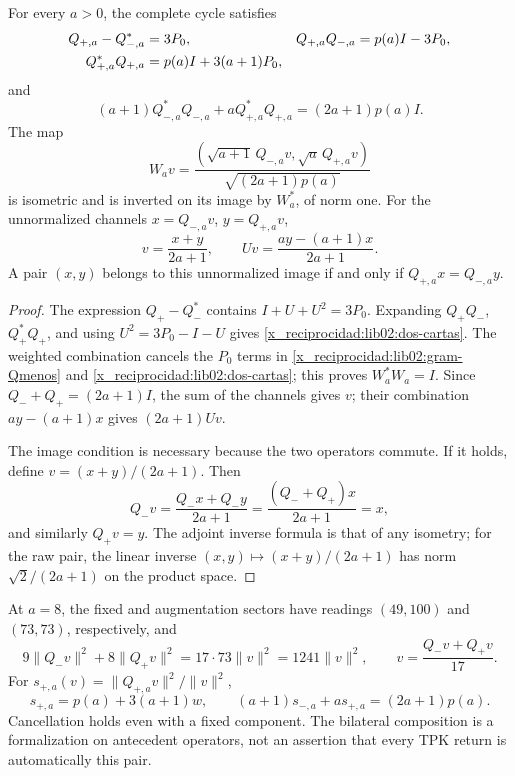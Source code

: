 \begin{theorem}
\label{x_reciprocidad:lib02:balance-bilateral}
For every \(a>0\), the complete cycle satisfies
\begin{align}
 Q_{+,a}-Q_{-,a}^*&=3P_0,&
 Q_{+,a}Q_{-,a}&=p(a)I-3P_0,\notag\\
 Q_{+,a}^*Q_{+,a}&=p(a)I+3(a+1)P_0,
 \label{x_reciprocidad:lib02:dos-cartas}
\end{align}
and
\begin{equation}
 (a+1)Q_{-,a}^*Q_{-,a}
 +aQ_{+,a}^*Q_{+,a}=(2a+1)p(a)I.
 \label{x_reciprocidad:lib02:balance-pesado}
\end{equation}
The map
\begin{equation}
 W_av=\frac{(\sqrt{a+1}\,Q_{-,a}v,
                    \sqrt a\,Q_{+,a}v)}{\sqrt{(2a+1)p(a)}}
 \label{x_reciprocidad:lib02:W}
\end{equation}
is isometric and is inverted on its image by \(W_a^*\), of norm one. For the unnormalized channels \(x=Q_{-,a}v\), \(y=Q_{+,a}v\),
\begin{equation}
 v=\frac{x+y}{2a+1},\qquad
 Uv=\frac{ay-(a+1)x}{2a+1}.
 \label{x_reciprocidad:lib02:reconstruccion-bilateral}
\end{equation}
A pair \((x,y)\) belongs to this unnormalized image if and only if \(Q_{+,a}x=Q_{-,a}y\).
\end{theorem}
\begin{proof}
The expression \(Q_+-Q_-^*\) contains \(I+U+U^2=3P_0\). Expanding \(Q_+Q_-\), \(Q_+^*Q_+\), and using \(U^2=3P_0-I-U\) gives \eqref{x_reciprocidad:lib02:dos-cartas}. The weighted combination cancels the \(P_0\) terms in \eqref{x_reciprocidad:lib02:gram-Qmenos} and \eqref{x_reciprocidad:lib02:dos-cartas}; this proves \(W_a^*W_a=I\). Since \(Q_-+Q_+=(2a+1)I\), the sum of the channels gives \(v\); their combination \(ay-(a+1)x\) gives \((2a+1)Uv\).

The image condition is necessary because the two operators commute. If it holds, define \(v=(x+y)/(2a+1)\). Then
\[
 Q_-v=\frac{Q_-x+Q_-y}{2a+1}
 =\frac{(Q_-+Q_+)x}{2a+1}=x,
\]
and similarly \(Q_+v=y\). The adjoint inverse formula is that of any isometry; for the raw pair, the linear inverse \((x,y)\mapsto(x+y)/(2a+1)\) has norm \(\sqrt2/(2a+1)\) on the product space.
\end{proof}

At \(a=8\), the fixed and augmentation sectors have readings \((49,100)\) and \((73,73)\), respectively, and
\[
 9\|Q_-v\|^2+8\|Q_+v\|^2=17\cdot73\|v\|^2=1241\|v\|^2,
 \qquad v=\frac{Q_-v+Q_+v}{17}.
\]
For \(s_{+,a}(v)=\|Q_{+,a}v\|^2/\|v\|^2\),
\[
 s_{+,a}=p(a)+3(a+1)w,
 \qquad (a+1)s_{-,a}+a s_{+,a}=(2a+1)p(a).
\]
Cancellation holds even with a fixed component. The bilateral composition is a formalization on antecedent operators, not an assertion that every TPK return is automatically this pair.

